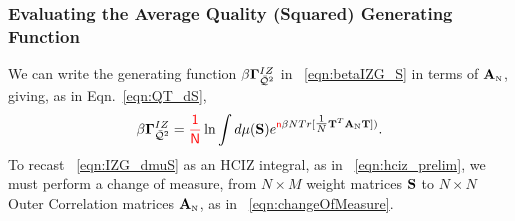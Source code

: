 %



\subsubsection{Evaluating the Average Quality (Squared) Generating Function }
\label{sxn:matgen_quality_hciz_B}

We can write the generating function $\beta\mathbf{\Gamma}^{IZ}_{\bar{\mathcal{Q}}^{2}}$ 
in \EQN~\ref{eqn:betaIZG_S} 
in terms of ${\mathbf{A}}_{\text{\tiny N}}$, giving, as in Eqn.~\ref{eqn:QT_dS}, 
\begin{align}
  \label{eqn:IZG_dmuS}
  \beta\mathbf{\Gamma}^{IZ}_{\bar{\mathcal{Q}}^{2}} = {\color{red}\sf{\frac{1}{N}}}\ln \int d\mu({\mathbf{S}})  e^{ {\color{red}\sf{n}}\beta N Tr[\tfrac{1}{N}{\mathbf{T}}^T{\mathbf{A}}_{\text{\tiny N}}{\mathbf{T}}]) }  .
\end{align}
To recast \EQN~\ref{eqn:IZG_dmuS} as an HCIZ integral, as in \EQN~\ref{eqn:hciz_prelim},
we must perform a change of measure,
 from $N\times M$ \Student weight matrices ${\mathbf{S}}$ to $N\times N$ Outer \Student Correlation matrices ${\mathbf{A}}_{\text{\tiny N}}$, as in \EQN~\ref{eqn:changeOfMeasure}.

